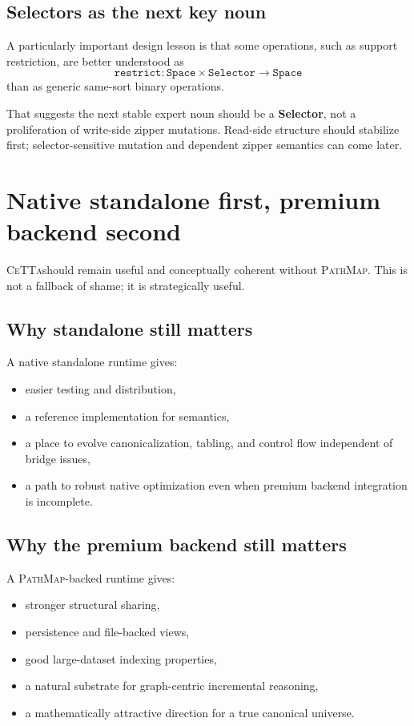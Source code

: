 \documentclass[11pt]{article}
\newcommand{\CeTTa}{\textsc{CeTTa}}
\newcommand{\PathMap}{\textsc{PathMap}}
\begin{document}
\subsection{Selectors as the next key noun}
A particularly important design lesson is that some operations, such as support restriction, are better understood as
\[
\texttt{restrict} : \texttt{Space} \times \texttt{Selector} \to \texttt{Space}
\]
than as generic same-sort binary operations.

That suggests the next stable expert noun should be a \textbf{Selector}, not a proliferation of write-side zipper mutations. Read-side structure should stabilize first; selector-sensitive mutation and dependent zipper semantics can come later.

\section{Native standalone first, premium backend second}
\CeTTa should remain useful and conceptually coherent without \PathMap. This is not a fallback of shame; it is strategically useful.

\subsection{Why standalone still matters}
A native standalone runtime gives:
\begin{itemize}
    \item easier testing and distribution,
    \item a reference implementation for semantics,
    \item a place to evolve canonicalization, tabling, and control flow independent of bridge issues,
    \item a path to robust native optimization even when premium backend integration is incomplete.
\end{itemize}

\subsection{Why the premium backend still matters}
A \PathMap-backed runtime gives:
\begin{itemize}
    \item stronger structural sharing,
    \item persistence and file-backed views,
    \item good large-dataset indexing properties,
    \item a natural substrate for graph-centric incremental reasoning,
    \item a mathematically attractive direction for a true canonical universe.
\end{itemize}
\end{document}
